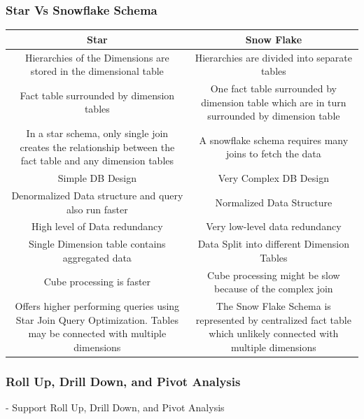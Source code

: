 \begin{frame}
\frametitle{Star Vs Snowflake Schema}
	\begin{table}[t]
		\centering				
			\begin{tabular}{| c | c|}
				\hline
				\textbf{Star}& \textbf{Snow Flake} \\
				\hline
				Hierarchies of the Dimensions are stored in the dimensional table	 & Hierarchies are divided into separate tables \\
				Fact table surrounded by dimension tables & One fact table surrounded by dimension table which are in turn surrounded by dimension table\\
				In a star schema, only single join creates the relationship between the fact table and any dimension tables &  A snowflake schema requires many joins to fetch the data\\
				Simple DB Design & Very Complex DB Design\\
				Denormalized Data structure and query also run faster & Normalized Data Structure\\
				High level of Data redundancy & Very low-level data redundancy\\
				Single Dimension table contains aggregated data & Data Split into different Dimension Tables\\
				Cube processing is faster & Cube processing might be slow because of the complex join\\
				Offers higher performing queries using Star Join Query Optimization. Tables may be connected with multiple dimensions & The Snow Flake Schema is represented by centralized fact table which unlikely connected with multiple dimensions\\
				
				\hline
			\end{tabular}
	\end{table}
\end{frame}
\begin{frame}
    \frametitle{Roll Up, Drill Down, and Pivot Analysis}

    - Support Roll Up, Drill Down, and Pivot Analysis\\

\end{frame}



